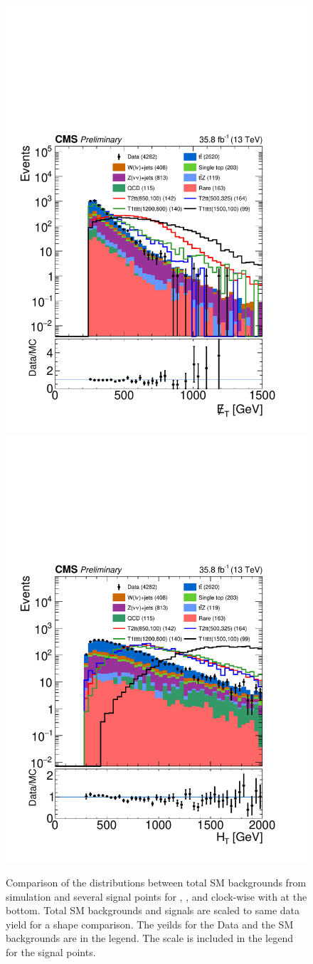 \begin{figure}[h]
\begin{center}
    \includegraphics[width=0.45\linewidth]{sections/mc4/EvtSelSBOpt/figures/DataMC_MET_model_met_baseline.pdf}
    \includegraphics[width=0.45\linewidth]{sections/mc4/EvtSelSBOpt/figures/DataMC_MET_model_ht_baseline.pdf}\\
    \caption{Comparison of the distributions between total SM backgrounds from simulation and several signal points for \ntops, \nbjets, \MET and \MTTwo clock-wise with \HT at the bottom. Total SM backgrounds and signals are scaled to same data yield for a shape comparison. The yeilds for the Data and the SM backgrounds are in the legend.  The scale is included in the legend for the signal points. }
    \label{fig:compSBvars}
  \end{center}
\end{figure}

